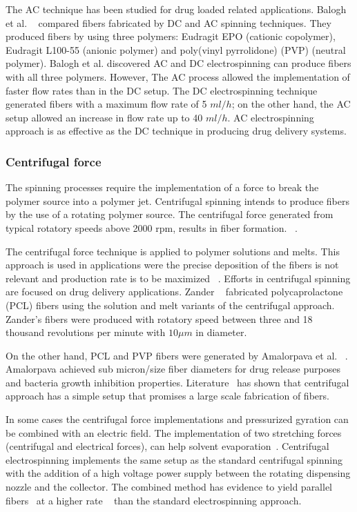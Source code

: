 \documentclass[5p,,preprint,12pt,twocolumn]{elsarticle}
\begin{document}
The AC technique has been studied for drug loaded related applications. Balogh et al. \unskip~\cite{527120:13445177} compared fibers fabricated by DC and AC spinning techniques. They produced fibers by using three polymers: Eudragit EPO (cationic copolymer), Eudragit L100-55 (anionic polymer) and poly(vinyl pyrrolidone) (PVP) (neutral polymer). Balogh et al. discovered AC and DC electrospinning can produce fibers with all three polymers. However, The AC process allowed the implementation of faster flow rates than in the DC setup. The DC electrospinning technique generated fibers with a maximum flow rate of 5 $ml/h $; on the other hand, the AC setup allowed an increase in flow rate up to 40 $ml/h $. AC electrospinning approach is as effective as the DC technique in producing drug delivery systems.



\subsubsection{Centrifugal force}The spinning processes require the implementation of a force to break the polymer source into a polymer jet. Centrifugal spinning intends to produce fibers by the use of a rotating polymer source. The centrifugal force generated from typical rotatory speeds above 2000 rpm, results in fiber formation. \unskip~\cite{527120:13535559,527120:13535561}.

The centrifugal force technique is applied to polymer solutions and melts. This approach is used in applications were the precise deposition of the fibers is not relevant and production rate is to be maximized \unskip~\cite{527120:13535894}.  Efforts in centrifugal spinning are focused on drug delivery applications. Zander \unskip~\cite{527120:13535977} fabricated polycaprolactone (PCL) fibers using the solution and melt variants of the centrifugal approach. Zander's fibers were produced with rotatory speed between three and 18 thousand revolutions per minute with $10 \mu m $ in diameter. 

On the other hand, PCL and PVP fibers were generated by Amalorpava et al. \unskip~\cite{527120:13536089}.  Amalorpava achieved sub micron/size fiber diameters for drug release purposes and bacteria growth inhibition properties. Literature\unskip~\cite{527120:13536446} has shown that centrifugal approach has a simple setup that promises a large scale fabrication of fibers.

In some cases the centrifugal force implementations and pressurized gyration can be combined with an electric field. The implementation of two stretching forces (centrifugal and electrical forces), can help solvent evaporation\unskip~\cite{527120:13536560}. Centrifugal electrospinning implements the same setup as the standard centrifugal spinning with the addition of a high voltage power supply between the rotating dispensing nozzle and the collector. The combined method has evidence to yield parallel fibers\unskip~\cite{527120:13536841,527120:13536900,527120:13537392,527120:13537393} at a higher rate \unskip~\cite{527120:13536841,527120:13536900} than the standard electrospinning approach.
\end{document}
